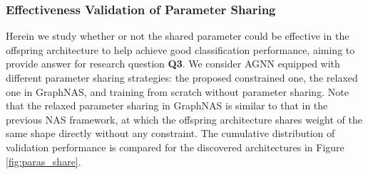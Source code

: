 \documentclass[sigconf]{acmart}
\begin{document}
\subsubsection{\textbf{Effectiveness Validation of Parameter Sharing}}
Herein we study whether or not the shared parameter could be effective in the offspring architecture to help achieve good classification performance, aiming to provide answer for research question \textbf{Q3}. We consider AGNN equipped with different parameter sharing strategies: the proposed constrained one, the relaxed one in GraphNAS, and training from scratch without parameter sharing. Note that the relaxed parameter sharing in GraphNAS is similar to that in the previous NAS framework, at which the offspring architecture shares weight of the same shape directly without any constraint. The cumulative distribution of validation performance is compared for the  discovered architectures in Figure \ref{fig:paras_share}. 

\begin{figure*}
\centering
\hspace{-.3cm}
\vspace{-.35cm}
\caption{The cumulative distribution of validation performance for AGNN under different parameter sharing strategies: the proposed constrained one, the relaxed one in GraphNAS, and training from scratch without parameter sharing.}
\label{fig:paras_share}
\end{figure*}
\end{document}
